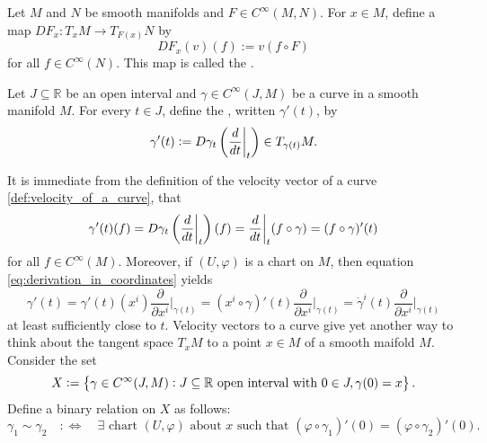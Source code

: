 \begin{definition}[Derivative]
	Let $M$ and $N$ be smooth manifolds and $F \in C^\infty(M,N)$. For $x \in M$, define a map $DF_x : T_xM \to T_{F(x)}N$ by
	\begin{equation*}
		DF_x(v)(f) := v(f \circ F)
	\end{equation*}
	\noindent for all $f \in C^\infty(N)$. This map is called the .
\end{definition}

\begin{definition}
	\label{def:velocity_of_a_curve}
	Let $J \subseteq \mathbb{R}$ be an open interval and $\gamma \in C^\infty(J,M)$ be a curve in a smooth manifold $M$. For every $t \in J$, define the , written $\gamma'(t)$, by
	\begin{equation*}
		\gamma'(t) := D\gamma_t\del[3]{\frac{d}{dt}\bigg\vert_t} \in T_{\gamma(t)}M.
	\end{equation*}
\end{definition}

It is immediate from the definition of the velocity vector of a curve \ref{def:velocity_of_a_curve}, that
\begin{equation*}
	\gamma'(t)(f) = D\gamma_t\del[3]{\frac{d}{dt}\bigg\vert_t}(f) = \frac{d}{dt}\bigg\vert_t(f \circ \gamma) = (f \circ \gamma)'(t)
\end{equation*}
\noindent for all $f \in C^\infty(M)$. Moreover, if $(U,\varphi)$ is a chart on $M$, then equation \ref{eq:derivation_in_coordinates} yields
\begin{equation}
	\label{eq:velocity_vector_in_coordinates}
	\gamma'(t) = \gamma'(t)(x^i)\frac{\partial}{\partial x^i}\bigg\vert_{\gamma(t)} = (x^i \circ \gamma)'(t)\frac{\partial}{\partial x^i}\bigg\vert_{\gamma(t)} = \dot{\gamma}^i(t)\frac{\partial}{\partial x^i}\bigg\vert_{\gamma(t)}
\end{equation}
\noindent at least sufficiently close to $t$. Velocity vectors to a curve give yet another way to think about the tangent space $T_xM$ to a point $x \in M$ of a smooth maifold $M$. Consider the set
\begin{equation*}
	X := \cbr{\gamma \in C^\infty(J,M) : J \subseteq \mathbb{R} \text{ open interval with } 0\in J, \gamma(0) = x}.
\end{equation*}
Define a binary relation on $X$ as follows:
\begin{equation*}
	\gamma_1 \sim \gamma_2 \quad :\Leftrightarrow \quad \exists \text{ chart $(U,\varphi)$ about $x$ such that } (\varphi \circ \gamma_1)'(0) = (\varphi \circ \gamma_2)'(0). 
\end{equation*}

